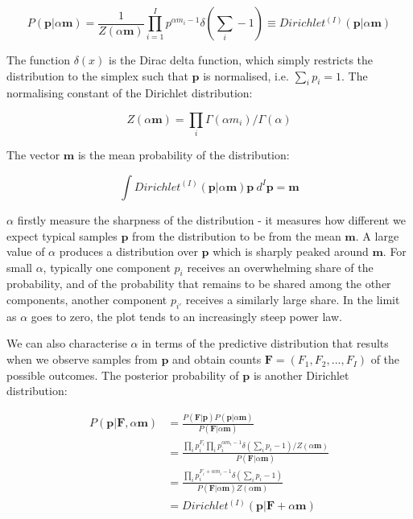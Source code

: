 \begin{equation}
P(\boldsymbol{p}|\alpha\boldsymbol{m})=\frac{1}{Z(\alpha\boldsymbol{m})}\prod_{i=1}^{I}p^{\alpha m_{i}-1}\delta\left (\sum_{i}-1\right )\equiv Dirichlet^{(I)}(\boldsymbol{p}|\alpha\boldsymbol{m})
\end{equation}

\noindent The function $\delta(x)$ is the Dirac delta function, which simply restricts the distribution to the simplex such that $\boldsymbol{p}$ is normalised, i.e. $\sum_{i}p_{i}=1$. The normalising constant of the Dirichlet distribution:

\begin{equation}
Z(\alpha\boldsymbol{m})=\prod_{i}\Gamma(\alpha m_{i})/\Gamma(\alpha)
\end{equation}

\noindent The vector $\boldsymbol{m}$ is the mean probability of the distribution:

\begin{equation}
\int Dirichlet^{(I)}(\boldsymbol{p}|\alpha\boldsymbol{m})\boldsymbol{p}\ d^{I}\boldsymbol{p}=\boldsymbol{m}
\end{equation}

$\alpha$ firstly measure the sharpness of the distribution - it measures how different we expect typical samples $\boldsymbol{p}$ from the distribution to be from the mean $\boldsymbol{m}$. A large value of $\alpha$ produces a distribution over $\boldsymbol{p}$ which is sharply peaked around $\boldsymbol{m}$. For small $\alpha$, typically one component $p_{i}$ receives an overwhelming share of the probability, and of the probability that remains to be shared among the other components, another component $p_{i'}$ receives a similarly large share. In the limit as $\alpha$ goes to zero, the plot tends to an increasingly steep power law.

We can also characterise $\alpha$ in terms of the predictive distribution that results when we observe samples from $\boldsymbol{p}$ and obtain counts $\boldsymbol{F}=(F_{1}, F_{2}, ..., F_{I})$ of the possible outcomes. The posterior probability of $\boldsymbol{p}$ is another Dirichlet distribution:

\begin{align}
P(\boldsymbol{p}|\boldsymbol{F}, \alpha\boldsymbol{m}) &= \frac{P(\boldsymbol{F}|\boldsymbol{p})P(\boldsymbol{p}|\alpha\boldsymbol{m})}{P(\boldsymbol{F}|\alpha\boldsymbol{m})}
\\
&= \frac{\prod_{i}p_{i}^{F_{i}}\prod_{i}p_{i}^{\alpha m_{i}-1} \delta \left (\sum_{i}p_{i}-1 \right)/Z(\alpha \boldsymbol{m})}{P(\boldsymbol{F}|\alpha\boldsymbol{m})}
\\
&= \frac{\prod_{i}p_{i}^{F_{i}+\alpha m_{i}-1} \delta \left(\sum_{i}p_{i}-1\right)}{P(\boldsymbol{F}|\alpha\boldsymbol{m})Z(\alpha\boldsymbol{m})}
\\
&= Dirichlet^{(I)}(\boldsymbol{p}|\boldsymbol{F}+\alpha\boldsymbol{m})
\end{align}

